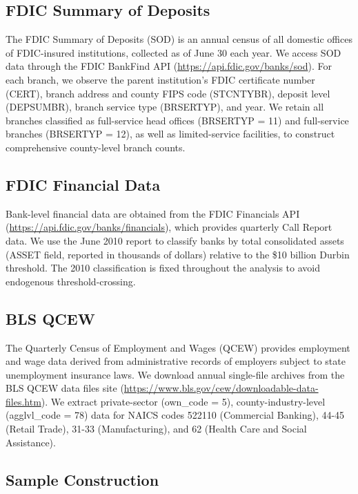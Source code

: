 \documentclass[12pt]{article}
\begin{document}
\subsection{FDIC Summary of Deposits}

The FDIC Summary of Deposits (SOD) is an annual census of all domestic offices of FDIC-insured institutions, collected as of June 30 each year. We access SOD data through the FDIC BankFind API (\url{https://api.fdic.gov/banks/sod}). For each branch, we observe the parent institution's FDIC certificate number (CERT), branch address and county FIPS code (STCNTYBR), deposit level (DEPSUMBR), branch service type (BRSERTYP), and year. We retain all branches classified as full-service head offices (BRSERTYP = 11) and full-service branches (BRSERTYP = 12), as well as limited-service facilities, to construct comprehensive county-level branch counts.

\subsection{FDIC Financial Data}

Bank-level financial data are obtained from the FDIC Financials API (\url{https://api.fdic.gov/banks/financials}), which provides quarterly Call Report data. We use the June 2010 report to classify banks by total consolidated assets (ASSET field, reported in thousands of dollars) relative to the \$10 billion Durbin threshold. The 2010 classification is fixed throughout the analysis to avoid endogenous threshold-crossing.

\subsection{BLS QCEW}

The Quarterly Census of Employment and Wages (QCEW) provides employment and wage data derived from administrative records of employers subject to state unemployment insurance laws. We download annual single-file archives from the BLS QCEW data files site (\url{https://www.bls.gov/cew/downloadable-data-files.htm}). We extract private-sector (own\_code = 5), county-industry-level (agglvl\_code = 78) data for NAICS codes 522110 (Commercial Banking), 44-45 (Retail Trade), 31-33 (Manufacturing), and 62 (Health Care and Social Assistance).

\subsection{Sample Construction}
\end{document}
